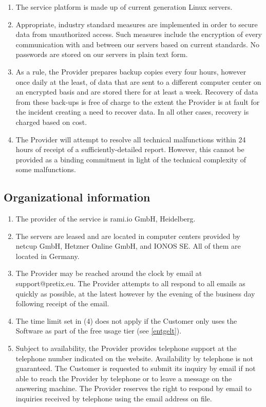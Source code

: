\documentclass{terms}
\begin{document}
\begin{enumerate}
\item The service platform is made up of current generation Linux servers.
\item Appropriate, industry standard measures are implemented in order to secure data from unauthorized access. Such measures include the encryption of every communication with and between our servers based on current standards. No passwords are stored on our servers in plain text form.
\item As a rule, the Provider prepares backup copies every four hours, however once daily at the least, of data that are sent to a different computer center on an encrypted basis and are stored there for at least a week. Recovery of data from these back-ups is free of charge to the extent the Provider is at fault for the incident creating a need to recover data. In all other cases, recovery is charged based on cost.
\item The Provider will attempt to resolve all technical malfunctions within 24 hours of receipt of a sufficiently-detailed report. However, this cannot be provided as a binding commitment in light of the technical complexity of some malfunctions.
\end{enumerate}
\subsection{Organizational information}
\begin{enumerate}
\item The provider of the service is rami.io GmbH, Heidelberg.
\item The servers are leased and are located in computer centers provided by netcup GmbH, Hetzner Online GmbH, and IONOS SE. All of them are located in Germany.
\item The Provider may be reached around the clock by email at support@pretix.eu. The Provider attempts to all respond to all emails as quickly as possible, at the latest however by the evening of the business day following receipt of the email.
\item The time limit set in (4) does not apply if the Customer only uses the Software as part of the free usage tier (see \ref{entgelt}).
\item Subject to availability, the Provider provides telephone support at the telephone number indicated on the website. Availability by telephone is not guaranteed. The Customer is requested to submit its inquiry by email if not able to reach the Provider by telephone or to leave a message on the answering machine. The Provider reserves the right to respond by email to inquiries received by telephone using the email address on file.
\end{enumerate}
\end{document}
